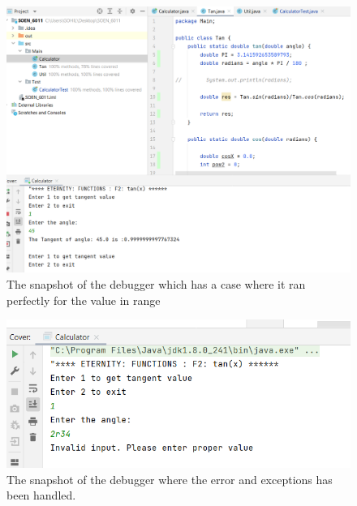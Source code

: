 \documentclass[a4paper, 11pt]{article}
\begin{document}
\begin{figure}[H]
\includegraphics[width=18cm]{debugger2.png}
\caption{The snapshot of the debugger which has a case where it ran perfectly for the value in range}
\label{exp}
\end{figure}

\begin{figure}[H]
\includegraphics[width=18cm]{debugger3.png}
\caption{The snapshot of the debugger where the error and exceptions has been handled. }
\label{exp}
\end{figure}
\end{document}
